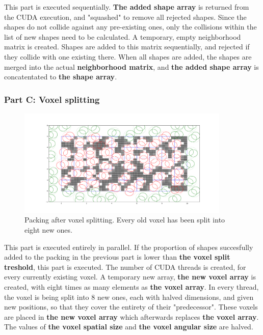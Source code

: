 \documentclass[12pt, oneside]{report}
\begin{document}
This part is executed sequentially. \newline
\textbf{The added shape array} is returned from the CUDA execution, and "squashed" to remove all rejected shapes. Since the shapes do not collide against any pre-existing ones, only the collisions within the list of new shapes need to be calculated. A temporary, empty neighborhood matrix is created. Shapes are added to this matrix sequentially, and rejected if they collide with one existing there. When all shapes are added, the shapes are merged into the actual \textbf{neighborhood matrix}, and \textbf{the added shape array} is concatentated to \textbf{the shape array}.

\subsubsection{Part C: Voxel splitting}

\begin{figure}[H]
  \centering
	\includegraphics[width=0.9\textwidth,keepaspectratio]{Images/GPURSA/Figure_5.pdf}
	\caption{Packing after voxel splitting. Every old voxel has been split into eight new ones.}
	\label{GPURSA_Process_5}
\end{figure}

This part is executed entirely in parallel. \newline
If the proportion of shapes succesfully added to the packing in the previous part is lower than \textbf{the voxel split treshold}, this part is executed. \newline
The number of CUDA threads is created, for every currently existing voxel. A temporary new array, \textbf{the new voxel array} is created, with eight times as many elements as \textbf{the voxel array}. In every thread, the voxel is being split into 8 new ones, each with halved dimensions, and given new positions, so that they cover the entirety of their "predecessor". These voxels are placed in \textbf{the new voxel array} which afterwards replaces \textbf{the voxel array}.
The values of \textbf{the voxel spatial size} and \textbf{the voxel angular size} are halved.
\end{document}

